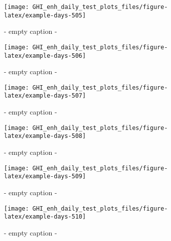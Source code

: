 \documentclass[
  10pt,
  a4paper,oneside]{article}
\begin{document}
\begin{figure}[H]

{\centering \texttt{[image: GHI\_enh\_daily\_test\_plots\_files/figure-latex/example-days-505]} 

}

\caption{ - empty caption - }\label{fig:example-days-505}
\end{figure}

\begin{figure}[H]

{\centering \texttt{[image: GHI\_enh\_daily\_test\_plots\_files/figure-latex/example-days-506]} 

}

\caption{ - empty caption - }\label{fig:example-days-506}
\end{figure}

\begin{figure}[H]

{\centering \texttt{[image: GHI\_enh\_daily\_test\_plots\_files/figure-latex/example-days-507]} 

}

\caption{ - empty caption - }\label{fig:example-days-507}
\end{figure}

\begin{figure}[H]

{\centering \texttt{[image: GHI\_enh\_daily\_test\_plots\_files/figure-latex/example-days-508]} 

}

\caption{ - empty caption - }\label{fig:example-days-508}
\end{figure}

\begin{figure}[H]

{\centering \texttt{[image: GHI\_enh\_daily\_test\_plots\_files/figure-latex/example-days-509]} 

}

\caption{ - empty caption - }\label{fig:example-days-509}
\end{figure}

\begin{figure}[H]

{\centering \texttt{[image: GHI\_enh\_daily\_test\_plots\_files/figure-latex/example-days-510]} 

}

\caption{ - empty caption - }\label{fig:example-days-510}
\end{figure}
\end{document}
